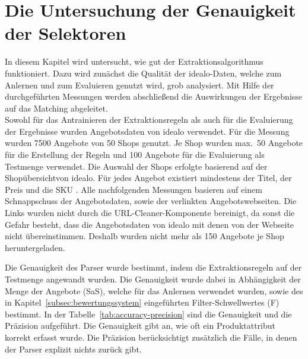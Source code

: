 \section{Die Untersuchung der Genauigkeit der Selektoren}
\label{sec:evaluierung}

In diesem Kapitel wird untersucht, wie gut der Extraktionsalgorithmus funktioniert.
Dazu wird zunächst die Qualität der idealo-Daten, welche zum Anlernen und zum Evaluieren genutzt wird, grob analysiert.
Mit Hilfe der durchgeführten Messungen werden abschließend die Auswirkungen der Ergebnisse auf das Matching
abgeleitet.\\
\newline
Sowohl für das Antrainieren der Extraktionsregeln als auch für die Evaluierung der Ergebnisse wurden Angebotsdaten
von idealo verwendet.
Für die Messung wurden 7500 Angebote von 50 Shops genutzt.
Je Shop wurden max.\ 50 Angebote für die Erstellung der Regeln und 100 Angebote für die Evaluierung als Testmenge
verwendet.
Die Auswahl der Shops erfolgte basierend auf der Shopübersicht\footnotemark von idealo.
Für jedes Angebot existiert mindestens der Titel, der Preis und die SKU .
Alle nachfolgenden Messungen basieren auf einem Schnappschuss der Angebotsdaten, sowie der verlinkten Angebotswebseiten.
Die Links wurden nicht durch die URL-Cleaner-Komponente bereinigt, da sonst die Gefahr besteht, dass die
Angebotsdaten von idealo mit denen von der Webseite nicht übereinstimmen.
Deshalb wurden nicht mehr als 150 Angebote je Shop heruntergeladen.

Die Genauigkeit des Parser wurde bestimmt, indem die Extraktionsregeln auf der Testmenge angewandt wurden.
Die Genauigkeit wurde dabei in Abhängigkeit der Menge der Angebote (SaS), welche für das Anlernen verwendet wurden,
sowie des in Kapitel~\ref{subsec:bewertungssystem} eingeführten Filter-Schwellwertes (F) bestimmt.
In der Tabelle~\ref{tab:accuracy-precision} sind die Genauigkeit und die Präzision aufgeführt.
Die Genauigkeit gibt an, wie oft ein Produktattribut korrekt erfasst wurde.
Die Präzision berücksichtigt zusätzlich die Fälle, in denen der Parser explizit nichts zurück gibt.

